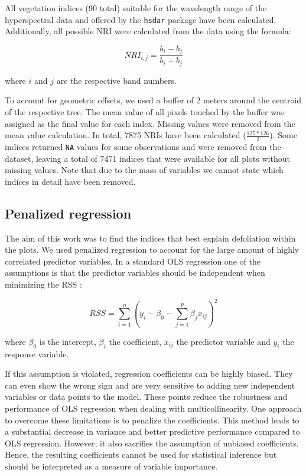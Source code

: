 \documentclass[review]{elsarticle}
\begin{document}
All vegetation indices (90 total) suitable for the wavelength range of the hyperspectral data and offered by the \texttt{hsdar} package have been calculated.
Additionally, all possible \ac{NRI} were calculated from the data using the formula:

\begin{equation}
	NRI_{i,j} = \frac{b_{i} - b_{j}}{b_{i} + b_{j}}
\end{equation}

\noindent
where $i$ and $j$ are the respective band numbers.

To account for geometric offsets, we used a buffer of 2 meters around the centroid of the respective tree.
The mean value of all pixels touched by the buffer was assigned as the final value for each index.
Missing values were removed from the mean value calculation.
In total, 7875 \ac{NRI}s have been calculated ($\frac{125*126}{2}$).
Some indices returned \texttt{NA} values for some observations and were removed from the dataset, leaving a total of 7471 indices that were available for all plots without missing values.
Note that due to the mass of variables we cannot state which indices in detail have been removed.

\subsection{Penalized regression}

The aim of this work was to find the indices that best explain defoliation within the plots.
We used penalized regression to account for the large amount of highly correlated predictor variables.
In a standard \ac{OLS} regression one of the assumptions is that the predictor variables should be independent when minimizing the \ac{RSS} \citep{Bare1981, Hastie2001}:

\begin{equation}
	RSS = \sum_{i=1}^{n} \left(y_{i} - \beta_{0} - \sum_{j=1}^{p} \beta_{j} x_{ij} \right) ^{2}
\end{equation}

where $\beta_{0}$ is the intercept, $\beta_{i}$ the coefficient, $x_{ij}$ the predictor variable and $y_{i}$ the response variable.

If this assumption is violated, regression coefficients can be highly biased.
They can even show the wrong sign and are very sensitive to adding new independent variables or data points to the model.
These points reduce the robustness and performance of \ac{OLS} regression when dealing with multicollinearity.
One approach to overcome these limitations is to penalize the coefficients.
This method leads to a substantial decrease in variance and better predictive performance compared to \ac{OLS} regression.
However, it also sacrifies the assumption of unbiased coefficients.
Hence, the resulting coefficients cannot be used for statistical inference but should be interpreted as a measure of variable importance.
\end{document}
